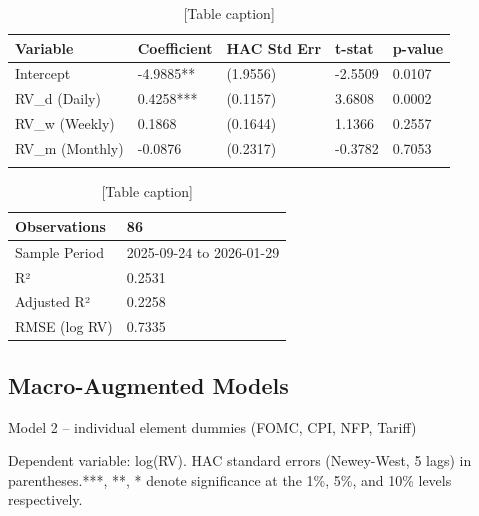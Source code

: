 \documentclass[12pt,a4paper]{report}
\begin{document}
\begin{table}[H]
\centering
\begin{tabular}{|l|l|l|l|l|}
\hline
Variable & Coefficient & HAC Std Err & t-stat & p-value \\
\hline
Intercept & -4.9885** & (1.9556) & -2.5509 & 0.0107 \\
\hline
RV_d (Daily) & 0.4258*** & (0.1157) & 3.6808 & 0.0002 \\
\hline
RV_w (Weekly) & 0.1868 & (0.1644) & 1.1366 & 0.2557 \\
\hline
RV_m (Monthly) & -0.0876 & (0.2317) & -0.3782 & 0.7053 \\
\hline
 &  &  &  &  \\
\hline
\end{tabular}
\caption{[Table caption]}
\end{table}
\begin{table}[H]
\centering
\begin{tabular}{|l|l|}
\hline
Observations & 86 \\
\hline
Sample Period & 2025-09-24 to 2026-01-29 \\
\hline
R² & 0.2531 \\
\hline
Adjusted R² & 0.2258 \\
\hline
RMSE (log RV) & 0.7335 \\
\hline
\end{tabular}
\caption{[Table caption]}
\end{table}
\subsection{Macro-Augmented Models}
Model 2 -- individual element dummies (FOMC, CPI, NFP, Tariff)

Dependent variable: log(RV). HAC standard errors (Newey-West, 5 lags) in parentheses.***, **, * denote significance at the 1\%, 5\%, and 10\% levels respectively.
\end{document}
